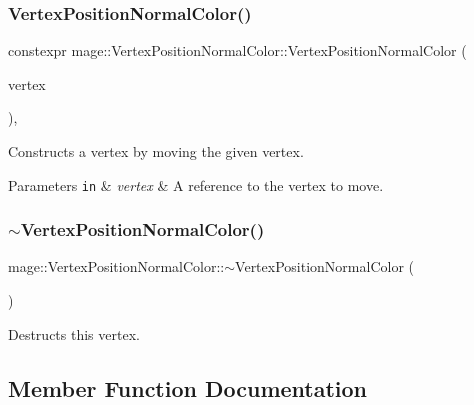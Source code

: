 \subsubsection{\texorpdfstring{Vertex\+Position\+Normal\+Color()}{VertexPositionNormalColor()}\hspace{0.1cm}{\footnotesize\ttfamily [4/4]}}
{\footnotesize\ttfamily constexpr mage\+::\+Vertex\+Position\+Normal\+Color\+::\+Vertex\+Position\+Normal\+Color (\begin{DoxyParamCaption}\item[{\hyperlink{structmage_1_1_vertex_position_normal_color}{Vertex\+Position\+Normal\+Color} \&\&}]{vertex }\end{DoxyParamCaption})\hspace{0.3cm}{\ttfamily [default]}, {\ttfamily [noexcept]}}

Constructs a vertex by moving the given vertex.


\begin{DoxyParams}[1]{Parameters}
\mbox{\tt in}  & {\em vertex} & A reference to the vertex to move. \\
\hline
\end{DoxyParams}
\hypertarget{structmage_1_1_vertex_position_normal_color_a4c51d0599843601d1cc1a6a55149aafe}{}\label{structmage_1_1_vertex_position_normal_color_a4c51d0599843601d1cc1a6a55149aafe} 
\subsubsection{\texorpdfstring{$\sim$\+Vertex\+Position\+Normal\+Color()}{~VertexPositionNormalColor()}}
{\footnotesize\ttfamily mage\+::\+Vertex\+Position\+Normal\+Color\+::$\sim$\+Vertex\+Position\+Normal\+Color (\begin{DoxyParamCaption}{ }\end{DoxyParamCaption})\hspace{0.3cm}{\ttfamily [default]}}

Destructs this vertex. 

\subsection{Member Function Documentation}
\hypertarget{structmage_1_1_vertex_position_normal_color_ab59f21c8f7ae5cef563365fc9b7d34c7}{}\label{structmage_1_1_vertex_position_normal_color_ab59f21c8f7ae5cef563365fc9b7d34c7} 
